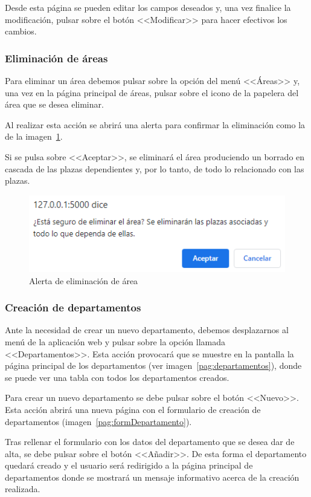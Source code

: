 Desde esta página se pueden editar los campos deseados y, una vez finalice la modificación, pulsar sobre el botón <<Modificar>> para hacer efectivos los cambios.

\subsubsection{Eliminación de áreas}
Para eliminar un área debemos pulsar sobre la opción del menú <<Áreas>> y, una vez en la página principal de áreas, pulsar sobre el icono de la papelera del área que se desea eliminar.

Al realizar esta acción se abrirá una alerta para confirmar la eliminación como la de la imagen~\ref{pag:alertElArea}.

Si se pulsa sobre <<Aceptar>>, se eliminará el área produciendo un borrado en cascada de las plazas dependientes y, por lo tanto, de todo lo relacionado con las plazas.

\begin{figure}
	\centering
	\includegraphics[width=.6\textwidth]{../img/Anexos/Manual usuario/alertElArea.png}
	\caption{Alerta de eliminación de área}\label{pag:alertElArea}
\end{figure}


\subsubsection{Creación de departamentos}
Ante la necesidad de crear un nuevo departamento, debemos desplazarnos al menú de la aplicación web y pulsar sobre la opción llamada <<Departamentos>>. 
Esta acción provocará que se muestre en la pantalla la página principal de los departamentos (ver imagen~\ref{pag:departamentos}), donde se puede ver una tabla con todos los departamentos creados.

Para crear un nuevo departamento se debe pulsar sobre el botón <<Nuevo>>.
Esta acción abrirá una nueva página con el formulario de creación de departamentos (imagen~\ref{pag:formDepartamento}).

Tras rellenar el formulario con los datos del departamento que se desea dar de alta, se debe pulsar sobre el botón <<Añadir>>.
De esta forma el departamento quedará creado y el usuario será redirigido a la página principal de departamentos donde se mostrará un mensaje informativo acerca de la creación realizada.

